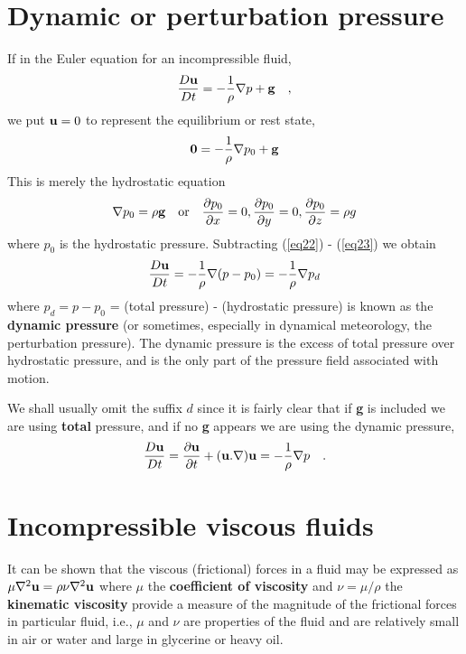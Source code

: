 \documentclass[twoside,a4paper,11pt]{report}
\begin{document}
\section{Dynamic or perturbation pressure}

If in the Euler equation for an incompressible fluid,
\begin{equation}
\label{eq22}
\frac{D{{\bf u}}}{Dt}=-\frac{1}{\rho }\nabla p+{\rm 
{\bf g}}\quad ,
\end{equation}
we put ${\bf u}=0$ to represent the equilibrium or rest state,
\begin{equation}
\label{eq23}
{{\bf 0}}=-\frac{1}{\rho }\nabla p_0 +{{\bf g}}
\end{equation}
This is merely the hydrostatic equation 
\[
\nabla p_0 =\rho {{\bf g}}\quad \mbox{or}\quad \frac{\partial 
p_0 }{\partial x}=0,\frac{\partial p_0 }{\partial 
y}=0,\frac{\partial p_0 }{\partial z}=\rho g
\]
where $p_0$ is the hydrostatic pressure. Subtracting (\ref{eq22}) - (\ref{eq23}) we 
obtain
\[
\frac{D{{\bf u}}}{Dt}=-\frac{1}{\rho }\nabla (p-p_0 
)=-\frac{1}{\rho }\nabla p_d 
\]
where $p_{d} = p - p_{0}$ = (total pressure) - (hydrostatic pressure) is 
known as the \textbf{dynamic pressure} (or sometimes, especially in 
dynamical meteorology, the perturbation pressure). The dynamic pressure is 
the excess of total pressure over hydrostatic pressure, and is the only part 
of the pressure field associated with motion.

We shall usually omit the suffix $d$ since it is fairly clear that if 
\textbf{g} is included we are using \textbf{total} pressure, and if no 
\textbf{g} appears we are using the dynamic pressure,
\[
\frac{D{{\bf u}}}{Dt}=\frac{\partial {{\bf u}}}{\partial 
t}+({{\bf u}}. \nabla ){{\bf 
u}}=-\frac{1}{\rho }\nabla p\quad .
\]

\section{Incompressible viscous fluids}

It can be shown that the viscous (frictional) forces in a fluid may be 
expressed as $\mu \nabla ^2{\bf u}=\rho \nu \nabla ^2{\bf u}$ where \textit{$\mu $} the 
\textbf{coefficient of viscosity} and $\nu =\mu /\rho $ the 
\textbf{kinematic viscosity} provide a measure of the magnitude of the 
frictional forces in particular fluid, i.e., $\mu $ and $\nu $ are 
properties of the fluid and are relatively small in air or water and large 
in glycerine or heavy oil.
\end{document}
